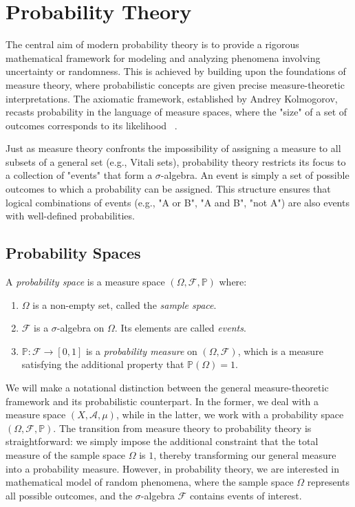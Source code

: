 \section{Probability Theory}\label{sec:probability-theory}


\indent
The central aim of modern probability theory is to provide a rigorous mathematical framework for modeling and analyzing phenomena involving uncertainty or randomness. This is achieved by building upon the foundations of measure theory, where probabilistic concepts are given precise measure-theoretic interpretations. The axiomatic framework, established by Andrey Kolmogorov, recasts probability in the language of measure spaces, where the "size" of a set of outcomes corresponds to its likelihood ~\cite[Chap 8]{MeasureTheoryLeGall}.

Just as measure theory confronts the impossibility of assigning a measure to all subsets of a general set (e.g., Vitali sets), probability theory restricts its focus to a collection of "events" that form a $\sigma$-algebra. An event is simply a set of possible outcomes to which a probability can be assigned. This structure ensures that logical combinations of events (e.g., "A or B", "A and B", "not A") are also events with well-defined probabilities.

\subsection{Probability Spaces}


\begin{definition}
    \label{def:probability-space}
    A \emph{probability space} is a measure space $(\Omega, \mathcal{F}, \mathbb{P})$ where:
    \begin{enumerate}[label=(\roman*)]
        \item $\Omega$ is a non-empty set, called the \emph{sample space}.
        \item $\mathcal{F}$ is a $\sigma$-algebra on $\Omega$. Its elements are called \emph{events}.
        \item $\mathbb{P}:\mathcal{F} \to [0, 1]$ is a \emph{probability measure} on $(\Omega, \mathcal{F})$, which is a measure satisfying the additional property that $\mathbb{P}(\Omega) = 1$.
    \end{enumerate}
\end{definition}

We will make a notational distinction between the general measure-theoretic framework and its probabilistic counterpart. In the former, we deal with a measure space $(X, \mathcal{A}, \mu)$, while in the latter, we work with a probability space $(\Omega, \mathcal{F}, \mathbb{P})$. The transition from measure theory to probability theory is straightforward: we simply impose the additional constraint that the total measure of the sample space $\Omega$ is $1$, thereby transforming our general measure into a probability measure. However, in probability theory, we are interested in mathematical model of random phenomena, where the sample space $\Omega$ represents all possible outcomes, and the $\sigma$-algebra $\mathcal{F}$ contains events of interest.


